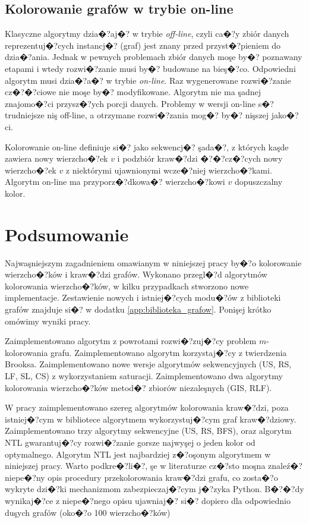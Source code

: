 \documentclass[12pt,a4paper]{mwrep}
\begin{document}
\section{Kolorowanie grafów w trybie on-line}
\label{sec:kolorowanie_online}

Klasyczne algorytmy dzia�?aj�? w trybie \emph{off-line},
czyli ca�?y zbiór danych reprezentuj�?cych instancj�? (graf)
jest znany przed przyst�?pieniem do dzia�?ania.
Jednak w pewnych problemach zbiór danych moşe by�? poznawany etapami
i wtedy rozwi�?zanie musi by�? budowane na bieş�?co.
Odpowiedni algorytm musi dzia�?a�? w trybie \emph{on-line}.
Raz wygenerowane rozwi�?zanie cz�?�?ciowe nie moşe by�? modyfikowane.
Algorytm nie ma şadnej znajomo�?ci przysz�?ych porcji danych.
Problemy w wersji on-line s�? trudniejsze niş off-line,
a otrzymane rozwi�?zania mog�? by�? nişszej jako�?ci.

Kolorowanie on-line definiuje si�? jako sekwencj�? şada�?,
z których kaşde zawiera nowy wierzcho�?ek $v$ i podzbiór kraw�?dzi
�?�?cz�?cych nowy wierzcho�?ek $v$ z niektórymi ujawnionymi wcze�?niej
wierzcho�?kami. Algorytm on-line ma przyporz�?dkowa�? wierzcho�?kowi
$v$ dopuszczalny kolor.



\chapter{Podsumowanie}
\label{ch:podsumowanie}

Najwaşniejszym zagadnieniem omawianym w niniejszej pracy
by�?o kolorowanie wierzcho�?ków i kraw�?dzi grafów.
Wykonano przegl�?d algorytmów kolorowania wierzcho�?ków,
w kilku przypadkach stworzono nowe implementacje.
Zestawienie nowych i istniej�?cych modu�?ów z biblioteki grafów
znajduje si�? w dodatku \ref{app:biblioteka_grafow}.
Ponişej krótko omówimy wyniki pracy.

Zaimplementowano algorytm z powrotami rozwi�?zuj�?cy problem
$m$-ko\-lo\-ro\-wa\-nia grafu.
Zaimplementowano algorytm korzystaj�?cy z twierdzenia Brooksa.
Zaimplementowano nowe wersje algorytmów sekwencyjnych
(US, RS, LF, SL, CS) z wykorzystaniem saturacji.
Zaimplementowano dwa algorytmy kolorowania wierzcho�?ków metod�? 
zbiorów niezaleşnych (GIS, RLF).

W pracy zaimplementowano szereg algorytmów kolorowania kraw�?dzi,
poza istniej�?cym w bibliotece algorytmem wykorzystuj�?cym graf kraw�?dziowy.
Zaimplementowano trzy algorytmy sekwencyjne (US, RS, BFS),
oraz algorytm NTL gwarantuj�?cy rozwi�?zanie gorsze najwyşej o jeden
kolor od optymalnego. Algorytm NTL jest najbardziej z�?oşonym
algorytmem w niniejszej pracy. Warto podkre�?li�?, şe w literaturze
cz�?sto moşna znaleź�? niepe�?ny opis procedury przekolorowania kraw�?dzi
grafu, co zosta�?o wykryte dzi�?ki mechanizmom zabezpieczaj�?cym
j�?zyka Python. B�?�?dy wynikaj�?ce z niepe�?nego opisu ujawniaj�? si�?
dopiero dla odpowiednio duşych grafów (oko�?o 100 wierzcho�?ków)
\end{document}
